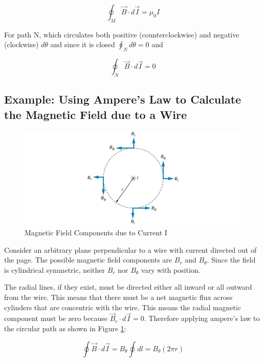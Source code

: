 \documentclass[14pt]{memoir}
\begin{document}
\begin{equation}
\oint_M \vec{B} \cdot d\vec{I} = \mu_0 I
\end{equation}

For path N, which circulates both positive (counterclockwise) and negative (clockwise) $d\theta$ and since it is closed $\oint_N d\theta = 0$ and

\begin{equation}
\oint_N \vec{B} \cdot d\vec{I} = 0
\end{equation}

\subsection{Example: Using Ampere's Law to Calculate the Magnetic Field due to a Wire}


\begin{figure}[H]
\begin{center}
\includegraphics[scale=0.5]{fig/fig_12_15.jpg}
\caption{Magnetic Field Components due to Current I}
\label{fig:12_15}
\end{center}
\end{figure}

Consider an arbitrary plane perpendicular to a wire with current directed out of the page. The possible magnetic field components are $B_r$ and $B_\theta$. Since the field is cylindrical symmetric, neither $B_r$ nor $B_\theta$ vary with position. 

The radial lines, if they exist, must be directed either all inward or all outward from the wire. This means that there must be a net magnetic flux across cylinders that are concentric with the wire. This means the radial magnetic component must be zero because $\vec{B}_r \cdot d \vec{I} = 0$. Therefore applying ampere's law to the circular path as shown in Figure \ref{fig:12_15}:

\begin{equation}
\oint \vec{B} \cdot d \vec{I} = B_\theta \oint dl = B_\theta (2 \pi r)
\end{equation}
\end{document}
